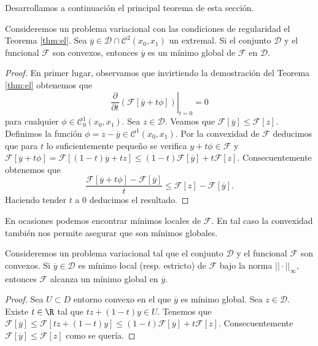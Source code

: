\documentclass{article}
\begin{document}
Desarrollamos a continuación el principal teorema de esta sección.

\begin{theorem}
  \label{thm:convex:minimo}
  Consideremos un problema variacional con las condiciones de regularidad el Teorema
  \ref{thm:el}. Sea $\overline{y} \in \mathcal{D} \cap \mathcal{C}^2(x_0,x_1)$ un extremal. Si el
  conjunto $\mathcal{D}$ y el funcional $\mathcal{F}$ son convexos, entonces $\overline{y}$ es un
  mínimo global de $\mathcal{F}$ en $\mathcal{D}$.
\end{theorem}
\begin{proof}
  En primer lugar, observamos que invirtiendo la demostración del Teorema \ref{thm:el} obtenemos que
  \[ \left.\frac{\partial}{\partial t}\left( \mathcal{F}[ \overline{y} + t \phi ] \right)\right|_{t
      = 0} = 0 \] para cualquier $\phi \in \mathcal{C}_0^1(x_0,x_1)$. Sea $z \in
  \mathcal{D}$. Veamos que $\mathcal{F}[ \overline{y} ] \le \mathcal{F}[z]$. Definimos la función
  $\phi = z - \overline{y} \in \mathcal{C}^1(x_0,x_1)$. Por la convexidad de $\mathcal{F}$
  deducimos que para $t$ lo suficientemente pequeño se verifica $y+t\phi \in \mathcal{F}$ y
  $\mathcal{F}[\overline{y}+t\phi] = \mathcal{F}[(1-t)\overline{y}+ tz] \le
  (1-t)\mathcal{F}[\overline{y}] + t \mathcal{F}[z]$. Consecuentemente obtenemos que
  \[ \frac{\mathcal{F}[\overline{y}+t\phi] - \mathcal{F}[\overline{y}]}{t} \le \mathcal{F}[z] -
    \mathcal{F}[\overline{y}]. \] Haciendo tender $t$ a $0$ deducimos el resultado.
\end{proof}

En ocasiones podemos encontrar mínimos locales de $\mathcal{F}$. En tal caso la convexidad también
nos permite asegurar que son mínimos globales.

\begin{prop}
  Consideremos un problema variacional tal que el conjunto $\mathcal{D}$ y el funcional
  $\mathcal{F}$ son convexos. Si $\overline{y} \in \mathcal{D}$ es mínimo local (resp. estricto) de
  $\mathcal{F}$ bajo la norma $||\cdot||_{\infty}$, entonces $\mathcal{F}$ alcanza un mínimo global
  en $\overline{y}$.
\end{prop}
\begin{proof}
  Sea $U \subset D$ entorno convexo en el que $\overline{y}$ es mínimo global. Sea
  $z \in \mathcal{D}$. Existe $t \in \R$ tal que $tz+(1-t)y \in U$. Tenemos que
  $\mathcal{F}[ \overline{y} ] \le \mathcal{F}[tz+(1-t)y] \le (1-t)\mathcal{F}[\overline{y}] + t
  \mathcal{F}[z]$. Consecuentemente $\mathcal{F}[ \overline{y} ] \le \mathcal{F}[z]$ como se quería.
\end{proof}
\end{document}
